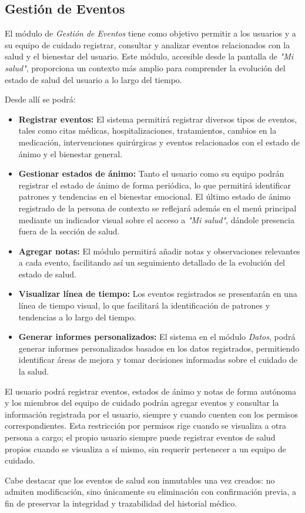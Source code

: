 \documentclass[a4paper,12pt]{article}
\begin{document}
    \subsection{Gestión de Eventos}
    \par El módulo de \textit{Gestión de Eventos} tiene como objetivo permitir a los usuarios y a su equipo de cuidado registrar, consultar y analizar eventos relacionados con la salud y el bienestar del usuario. Este módulo, accesible desde la pantalla de \textit{"Mi salud"}, proporciona un contexto más amplio para comprender la evolución del estado de salud del usuario a lo largo del tiempo.
    \par Desde allí se podrá:
    \begin{itemize}
        \item \textbf{Registrar eventos:} El sistema permitirá registrar diversos tipos de eventos, tales como citas médicas, hospitalizaciones, tratamientos, cambios en la medicación, intervenciones quirúrgicas y eventos relacionados con el estado de ánimo y el bienestar general.
        \item \textbf{Gestionar estados de ánimo:} Tanto el usuario como su equipo podrán registrar el estado de ánimo de forma periódica, lo que permitirá identificar patrones y tendencias en el bienestar emocional. El último estado de ánimo registrado de la persona de contexto se reflejará además en el menú principal mediante un indicador visual sobre el acceso a \textit{"Mi salud"}, dándole presencia fuera de la sección de salud.
        \item \textbf{Agregar notas:} El módulo permitirá añadir notas y observaciones relevantes a cada evento, facilitando así un seguimiento detallado de la evolución del estado de salud.
        \item \textbf{Visualizar línea de tiempo:}  Los eventos registrados se presentarán en una línea de tiempo visual, lo que facilitará la identificación de patrones y tendencias a lo largo del tiempo.
        \item \textbf{Generar informes personalizados:} El sistema en el módulo \textit{Datos}, podrá generar informes personalizados basados en los datos registrados, permitiendo identificar áreas de mejora y tomar decisiones informadas sobre el cuidado de la salud.
    \end{itemize}
    \par El usuario podrá registrar eventos, estados de ánimo y notas de forma autónoma y los miembros del equipo de cuidado podrán agregar eventos y consultar la información registrada por el usuario, siempre y cuando cuenten con los permisos correspondientes. Esta restricción por permisos rige cuando se visualiza a otra persona a cargo; el propio usuario siempre puede registrar eventos de salud propios cuando se visualiza a sí mismo, sin requerir pertenecer a un equipo de cuidado.
    \par Cabe destacar que los eventos de salud son inmutables una vez creados: no admiten modificación, sino únicamente su eliminación con confirmación previa, a fin de preservar la integridad y trazabilidad del historial médico.
\end{document}
